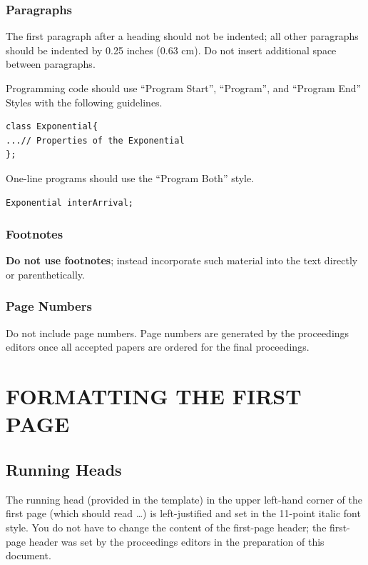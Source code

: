 \documentclass{wscpaperproc}
\theoremstyle{wsc}
\begin{document}
\subsubsection{Paragraphs}
The first paragraph after a heading should not be indented; all other paragraphs should be indented by 0.25 inches (0.63 cm). Do not insert additional space between paragraphs.

Programming code should use ``Program Start'', ``Program'', and ``Program End'' Styles with the following guidelines.

\begin{verbatim}
class Exponential{
...// Properties of the Exponential
};
\end{verbatim}

One-line programs should use the “Program Both” style.

\begin{verbatim}
Exponential interArrival;
\end{verbatim}

\subsubsection{Footnotes}
\textbf{Do not use footnotes}; instead incorporate such material into the text directly or parenthetically.

\subsubsection{Page Numbers}
Do not include page numbers. Page numbers are generated by the proceedings editors once all accepted papers are ordered for the final proceedings.

\section{FORMATTING THE FIRST PAGE}

\subsection{Running Heads}
The running head (provided in the template) in the upper left-hand corner of the first page (which should read {\em \currentCaption}\dots) is left-justified and set in the 11-point italic font style. You do not have to change the content of the first-page header; the first-page header was set by the proceedings editors in the preparation of this document.
\end{document}
